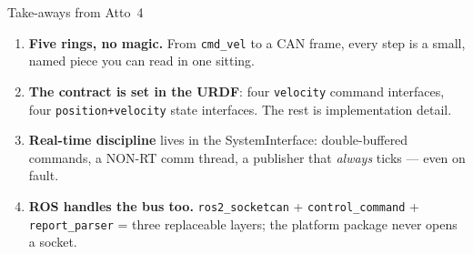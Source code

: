 \begin{frame}{Take-aways from Atto~4}
  \begin{enumerate}\setlength\itemsep{2pt}
    \item \textbf{Five rings, no magic.} From \texttt{cmd\_vel} to a CAN
          frame, every step is a small, named piece you can read in one
          sitting.
    \item \textbf{The contract is set in the URDF}: four \texttt{velocity}
          command interfaces, four \texttt{position+velocity} state
          interfaces. The rest is implementation detail.
    \item \textbf{Real-time discipline} lives in the SystemInterface:
          double-buffered commands, a NON-RT comm thread, a publisher that
          \emph{always} ticks — even on fault.
    \item \textbf{ROS handles the bus too.} \texttt{ros2\_socketcan} +
          \texttt{control\_command} + \texttt{report\_parser} = three
          replaceable layers; the platform package never opens a socket.
  \end{enumerate}
\end{frame}
